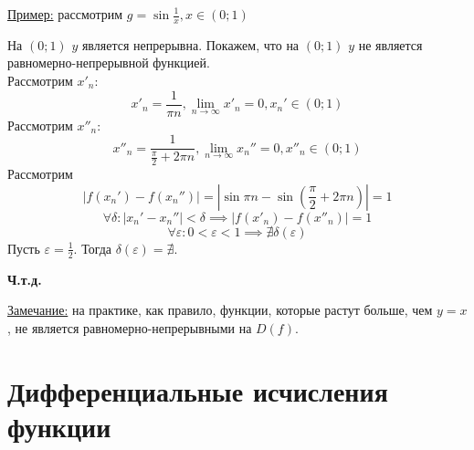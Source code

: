 \documentclass[12pt]{article}
\begin{document}
    \underline{Пример:} рассмотрим $g = \sin \frac{1}{x}, x \in (0; 1)$
    \begin{adjustwidth}{1.5em}{1.5em}
        На $(0; 1)$ $y$ является непрерывна. Покажем, что на $(0; 1)$ $y$ не является равномерно-непрерывной функцией.\\
        Рассмотрим $x'_n$:
        \[x'_n = \frac{1}{\pi n}, \lim_{n\to\infty} x'_n = 0, x_n' \in (0; 1)\]
        Рассмотрим $x''_n$: 
        \[x''_n = \frac{1}{\frac{\pi}{2}+2\pi n}, \lim_{n\to\infty}x_n'' = 0, x''_n \in (0; 1)\]
        Рассмотрим 
        \[|f(x_n') - f(x_n'')| = |\sin \pi n - \sin (\frac{\pi}{2} + 2\pi n)| = 1\]
        \[ \forall \delta : |x_n' - x_n''| < \delta \implies |f(x'_n) - f(x''_n)| = 1 \]
        \[ \forall \varepsilon : 0 < \varepsilon < 1 \implies \nexists \delta(\varepsilon) \]
        Пусть $\varepsilon = \frac{1}{2}$. Тогда $\delta(\varepsilon) = \nexists$.
        \begin{center}
            \textbf{Ч.т.д.}
        \end{center}
    \end{adjustwidth}
    \underline{Замечание:} на практике, как правило, функции, которые растут больше, чем $y=x$, не является равномерно-непрерывными на $D(f)$.



    \section{Дифференциальные исчисления функции}
\end{document}
